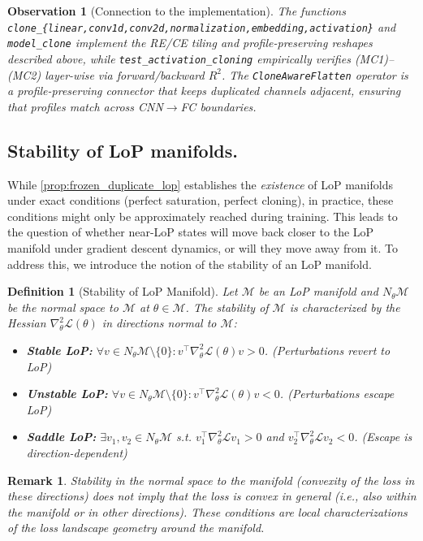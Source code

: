 \documentclass{article}
\newcommand{\Loss}{\mathcal{L}}
\newtheorem{definition}{Definition}[section]
\newtheorem{remark}{Remark}[section]
\newtheorem{observation}{Observation}[section] %
\numberwithin{figure}{section}
\begin{document}
\begin{observation}[Connection to the implementation]
\label{obs:implementation_link}
The functions \texttt{clone\_\{linear,conv1d,conv2d,normalization,embedding,activation\}} and \texttt{model\_clone} implement the RE/CE tiling and profile-preserving reshapes described above, while \texttt{test\_activation\_cloning} empirically verifies (MC1)–(MC2) layer-wise via forward/backward $R^2$. The \texttt{CloneAwareFlatten} operator is a profile-preserving connector that keeps duplicated channels adjacent, ensuring that profiles match across CNN$\to$FC boundaries.
\end{observation}


\subsection{Stability of LoP manifolds.}
While \cref{prop:frozen_duplicate_lop} establishes the \emph{existence} of LoP manifolds under exact conditions (perfect saturation, perfect cloning), in practice, these conditions might only be approximately reached during training. This leads to the question of whether  near-LoP states will move back closer to the LoP manifold under gradient descent dynamics, or will they move away from it. To address this, we introduce the notion of the stability of an LoP manifold.
\begin{definition}[Stability of LoP Manifold]
\label{def:lop_stability_main}
Let $\mathcal{M}$ be an LoP manifold and $N_\theta\mathcal{M}$ be the normal space to $\mathcal{M}$ at $\theta \in \mathcal{M}$. The stability of $\mathcal{M}$ is characterized by the Hessian $\nabla_\theta^2\Loss(\theta)$ in directions normal to $\mathcal{M}$:
\begin{itemize}
    \item \textbf{Stable LoP:} $\forall v\in N_\theta\mathcal{M}\setminus\{0\}: v^\top\nabla_\theta^2\Loss(\theta)v > 0$. (Perturbations revert to LoP)
    \item \textbf{Unstable LoP:} $\forall v\in N_\theta\mathcal{M}\setminus\{0\}: v^\top\nabla_\theta^2\Loss(\theta)v < 0$. (Perturbations  escape LoP)
    \item \textbf{Saddle LoP:} $\exists v_1,v_2\in N_\theta\mathcal{M}$ s.t. $v_1^\top\nabla_\theta^2\Loss v_1>0$ and $v_2^\top\nabla_\theta^2\Loss v_2<0$. (Escape is direction-dependent)
\end{itemize}
\end{definition}
\begin{remark}
Stability in the normal space to the manifold (convexity of the loss in these directions) does not imply that the loss is convex in general (i.e., also within the manifold or in other directions). These conditions are local characterizations of the loss landscape geometry around the manifold.
\end{remark}
\end{document}
